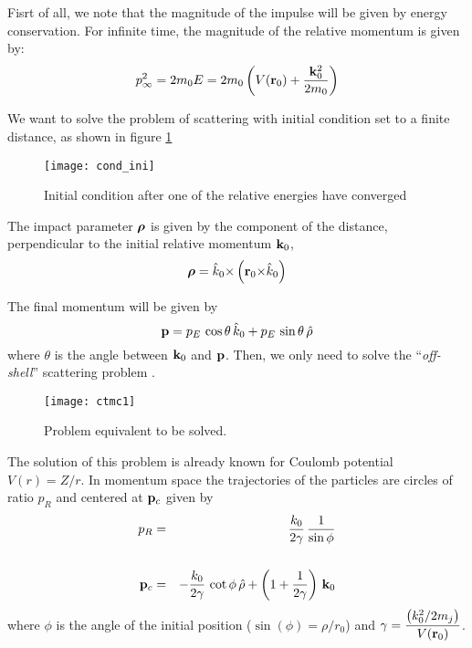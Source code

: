 Fisrt of all, we note that the magnitude of the impulse will be given by energy conservation. For infinite time, the magnitude of the relative momentum is given by:
%
\begin{equation}
  \label{Q:ctmc_magnitude}
p_{\infty}^{2}= 2 m_{0} E = 2 m_{0} \left(V(\mathbf{r}_{0}) + \frac{\mathbf{k}^{2}_{0}}{2 m_{0}}  \right)
\end{equation}

We want to solve the problem of scattering with initial condition set
to a finite distance, as shown in figure \ref{f:cond-ini}

\begin{figure}[h]\label{f:cond-ini}
\centering \texttt{[image: cond\_ini]}
\caption{Initial condition after one of the relative energies have
converged}
\end{figure}

The impact parameter $\boldsymbol{\rho}$ is given by the component of the distance,
perpendicular to the initial relative momentum $\mathbf{k}_{0}$,
\begin{equation}\label{Q:rho}
\boldsymbol{\rho} = \hat{k}_{0} {\times} \left( \mathbf{r}_{0} {\times} \hat{k}_{0} \right)
\end{equation}

The final momentum will be given by
\begin{equation}\label{Q:finalmom}
\mathbf{p} = p_{E} \, \cos{\theta} \, \hat{k}_{0}+ p_{E}\, \sin{\theta}\,
\hat{\rho}
\end{equation}
%
where $\theta $ is the angle between $\mathbf{k}_{0}$ and $\mathbf{p}$. Then,
we only need to solve the ``\textit{off-shell}'' scattering problem
\cite{Fiol2000JPBp2847}.

\begin{figure}[!htpb]
  \centering
 \texttt{[image: ctmc1]}
  \caption{Problem equivalent to be solved.
  \label{f:ctmc1}}
\end{figure}


The solution of this problem is already known for Coulomb potential
$V(r) = Z/r$. In momentum space the trajectories of the particles are
circles of ratio $p_{R}$ and centered at $\mathbf{p}_{c}$ given by
\begin{eqnarray}\label{Q:circle-mom}
p_{R} &=& \frac{k_{0}}{2 \gamma} \, \frac{1}{\sin{\phi}} \nonumber \\
\\
\mathbf{p}_{c} &=& - \frac{k_{0}}{2 \gamma } \, \cot{\phi}\, \hat{\rho} +
\left( 1 + \frac{1}{2 \gamma} \right) \, \mathbf{k}_{0} \nonumber
\end{eqnarray}
where $\phi$ is the angle of the initial position ($\sin(\phi) =
\rho/r_{0}$) and $\displaystyle{\gamma = \frac{\left( k_{0}^{2}/2 m_{j}
\right)}{V(\mathbf{r}_{0})}}$.

